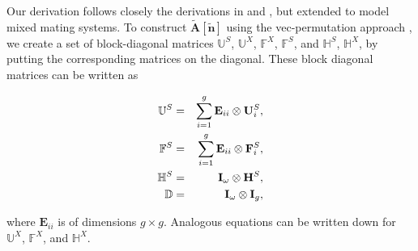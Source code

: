 \documentclass[11pt]{article}
\def\mbf#1{\mathbf{#1}}
\def\mbb#1{\mathbb{#1}}
\newcommand{\bo}[1]{{\bf #1}}
\newcommand{\om}{\omega}
\newcommand{\kron}{\otimes}
\begin{document}
Our derivation follows closely the derivations in \cite{deVriesCaswell2019a} and \cite{deVriesCaswell2019b}, but extended to model mixed mating systems. To construct $\tilde{\mbf{A}}[\tilde{\mbf{n}}]$ using the vec-permutation approach \citep{CaswellEtAl2018}, we create a set of block-diagonal matrices $\mathbb{U}^S$, $\mathbb{U}^X$, $\mathbb{F}^X$, $\mathbb{F}^S$, and $\mathbb{H}^S$, $\mathbb{H}^X$, by putting the corresponding matrices on the diagonal. These block diagonal matrices can be written as
\begin{linenomath*}
\begin{eqnarray}
 \mathbb{U}^S&=&\sum_{i=1}^g \mathbf{E}_{ii} \otimes \mathbf{U}^S_{i}, \label{eq:US_app}\\
 \mathbb{F}^S&=&\sum_{i=1}^g \mathbf{E}_{ii} \otimes \mathbf{F}^S_{i}, \label{eq:FS_app}\\
  \mathbb{H}^S &=& \bo I_\om \kron \bo H^S , \label{eq:HS_app} \\
      \mathbb{D} &=& \bo I_\om \kron \bo I_g, \label{eq:D_app} 
\end{eqnarray}
\end{linenomath*}
where $\mathbf{E}_{ii}$ is of dimensions $g \times g$. Analogous equations can be written down for $ \mathbb{U}^X$, $ \mathbb{F}^X$, and $ \mathbb{H}^X$.  
\end{document}
